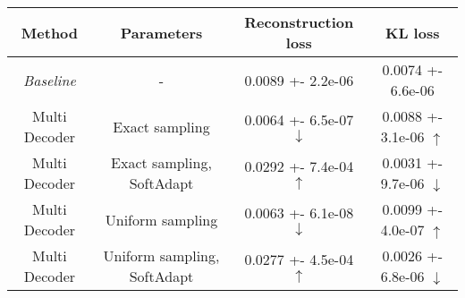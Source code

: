 \centering
\scriptsize
\begin{tabular}{||c|c|c|c||}
\hline
 Method & Parameters & Reconstruction loss & KL loss \\
\hline
\textit{Baseline} & - & 0.0089 +- 2.2e-06 & 0.0074 +- 6.6e-06 \\
\hline
Multi Decoder & Exact sampling & 0.0064 +- 6.5e-07  $\downarrow$ & 0.0088 +- 3.1e-06  $\uparrow$ \\
\hline
Multi Decoder & Exact sampling, SoftAdapt & 0.0292 +- 7.4e-04  $\uparrow$ & 0.0031 +- 9.7e-06  $\downarrow$ \\
\hline
Multi Decoder & Uniform sampling & 0.0063 +- 6.1e-08  $\downarrow$ & 0.0099 +- 4.0e-07  $\uparrow$ \\
\hline
Multi Decoder & Uniform sampling, SoftAdapt & 0.0277 +- 4.5e-04  $\uparrow$ & 0.0026 +- 6.8e-06  $\downarrow$ \\
\hline
\end{tabular}
